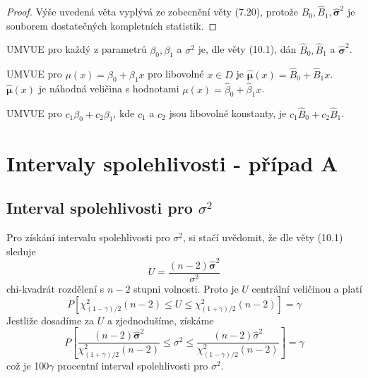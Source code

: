 \begin{proof}
Výše uvedená věta vyplývá ze zobecnění věty (7.20), protože $\hat{B}_0, \hat{B}_1, \hat{\boldsymbol \sigma}^2$ je souborem dostatečných kompletních statistik.
\end{proof}

\begin{corollary}
UMVUE pro každý z parametrů $\beta_0, \beta_1$ a $\sigma^2$ je, dle věty (10.1), dán $\hat{B}_0, \hat{B}_1$ a $\hat{\boldsymbol \sigma}^2$.
\end{corollary}

\begin{corollary}
UMVUE pro $\mu(x) = \beta_0 + \beta_1 x$ pro libovolné $x \in D$ je $\hat{\boldsymbol \mu}(x) = \hat{B}_0 + \hat{B}_1 x$. $\hat{\boldsymbol \mu}(x)$ je náhodná veličina s hodnotami $\mu(x) = \hat{\beta}_0 + \hat{\beta}_1 x$.
\end{corollary}

\begin{corollary}
UMVUE pro $c_1 \beta_0 + c_2 \beta_1$, kde $c_1$ a $c_2$ jsou libovolné konstanty, je $c_1 \hat{B}_0 + c_2 \hat{B}_1$.
\end{corollary}

\section{Intervaly spolehlivosti - případ A}

\subsection{Interval spolehlivosti pro $\sigma^2$}

Pro získání intervalu spolehlivosti pro $\sigma^2$, si stačí uvědomit, že dle věty (10.1) sleduje
\begin{equation*}
U = \frac{(n - 2)\hat{\boldsymbol \sigma}^2}{\sigma^2}
\end{equation*}
chi-kvadrát rozdělení s $n - 2$ stupni volnosti. Proto je $U$ centrální veličinou a platí
\begin{equation*}
P[\chi^2_{(1 - \gamma)/2}(n - 2) \le U \le \chi^2_{(1 + \gamma)/2}(n - 2)] = \gamma
\end{equation*}
Jestliže dosadíme za $U$ a zjednodušíme, získáme
\begin{equation*}
P\left[\frac{(n - 2)\hat{\boldsymbol \sigma}^2}{\chi^2_{(1 + \gamma)/2}(n - 2)} \le \sigma^2 \le \frac{(n - 2)\hat{\sigma}^2}{\chi^2_{(1 - \gamma)/2}(n - 2)}\right] = \gamma
\end{equation*}
což je 100$\gamma$ procentní interval spolehlivosti pro $\sigma^2$.

